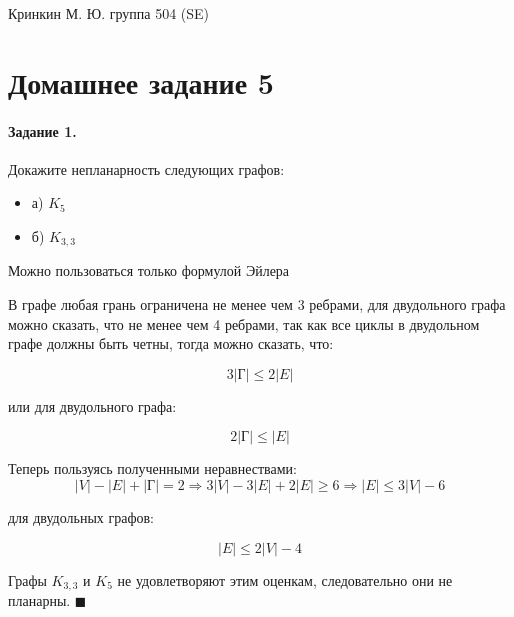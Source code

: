 \documentclass[a4paper,12pt]{article}
\begin{document}
\lstset{
	basicstyle=\small,
	stringstyle=\ttfamily,
	showstringspaces=false,
	columns=fixed,
	breaklines=true,
	numbers=right,
	numberstyle=\tiny
}

\newtheorem{Def}{Определение}[section]
\newtheorem{Th}{Теорема}
\newtheorem{Lem}[Th]{Лемма}
\newenvironment{Proof}
	{\par\noindent{\bf Доказательство.}}
	{\hfill$\scriptstyle\blacksquare$}
\newenvironment{Solution}
	{\par\noindent{\bf Решение.}}
	{\hfill$\scriptstyle\blacksquare$}

\begin{flushright}
	Кринкин М. Ю. группа 504 (SE)
\end{flushright}

\section{Домашнее задание 5}

\paragraph{Задание 1.} Докажите непланарность следующих графов:

\begin{itemize}
\item а) $K_5$

\item б) $K_{3,3}$
\end{itemize}

Можно пользоваться только формулой Эйлера

\begin{Solution}
В графе любая грань ограничена не менее чем 3 ребрами, для двудольного графа можно сказать, что не менее чем 4 ребрами, так как все циклы в двудольном графе должны быть четны, тогда можно сказать, что:

\[
	3 \left|\text{Г}\right| \le 2 \left|E\right|
\]

или для двудольного графа:

\[
	2 \left|\text{Г}\right| \le \left|E\right|
\]

Теперь пользуясь полученными неравнествами:
\[
	\left|V\right|-\left|E\right|+\left|\text{Г}\right| = 2 \Rightarrow 3\left|V\right|-3\left|E\right|+2\left|E\right| \ge 6 \Rightarrow \left|E\right| \le 3\left|V\right| - 6
\]

для двудольных графов:

\[
	\left|E\right| \le 2 \left|V\right| - 4
\]

Графы $K_{3,3}$ и $K_5$ не удовлетворяют этим оценкам, следовательно они не планарны.
\end{Solution}
\end{document}
